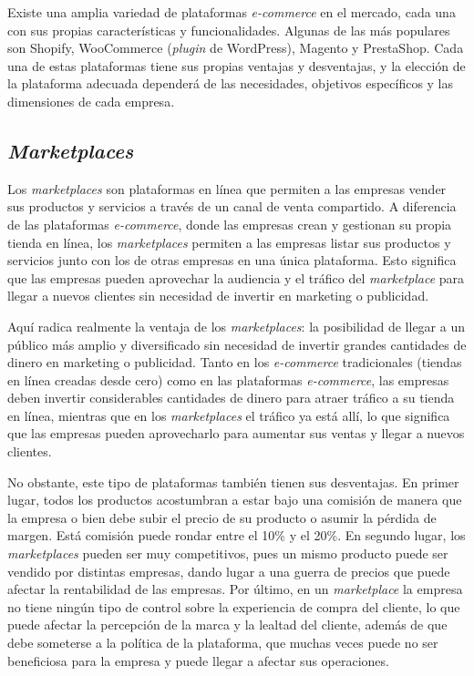 Existe una amplia variedad de plataformas \textit{e-commerce} en el mercado, cada una con sus propias características y funcionalidades. Algunas de las más populares son Shopify, WooCommerce (\textit{plugin} de WordPress), Magento y PrestaShop. Cada una de estas plataformas tiene sus propias ventajas y desventajas, y la elección de la plataforma adecuada dependerá de las necesidades, objetivos específicos y las dimensiones de cada empresa.

\subsection{\textit{Marketplaces}}

Los \textit{marketplaces} son plataformas en línea que permiten a las empresas vender sus productos y servicios a través de un canal de venta compartido. A diferencia de las plataformas \textit{e-commerce}, donde las empresas crean y gestionan su propia tienda en línea, los \textit{marketplaces} permiten a las empresas listar sus productos y servicios junto con los de otras empresas en una única plataforma. Esto significa que las empresas pueden aprovechar la audiencia y el tráfico del \textit{marketplace} para llegar a nuevos clientes sin necesidad de invertir en marketing o publicidad.

Aquí radica realmente la ventaja de los \textit{marketplaces}: la posibilidad de llegar a un público más amplio y diversificado sin necesidad de invertir grandes cantidades de dinero en marketing o publicidad. Tanto en los \textit{e-commerce} tradicionales (tiendas en línea creadas desde cero) como en las plataformas \textit{e-commerce}, las empresas deben invertir considerables cantidades de dinero para atraer tráfico a su tienda en línea, mientras que en los \textit{marketplaces} el tráfico ya está allí, lo que significa que las empresas pueden aprovecharlo para aumentar sus ventas y llegar a nuevos clientes.

No obstante, este tipo de plataformas también tienen sus desventajas. En primer lugar, todos los productos acostumbran a estar bajo una comisión de manera que la empresa o bien debe subir el precio de su producto o asumir la pérdida de margen. Está comisión puede rondar entre el 10\% y el 20\%. En segundo lugar, los \textit{marketplaces} pueden ser muy competitivos, pues un mismo producto puede ser vendido por distintas empresas, dando lugar a una guerra de precios que puede afectar la rentabilidad de las empresas. Por último, en un \textit{marketplace} la empresa no tiene ningún tipo de control sobre la experiencia de compra del cliente, lo que puede afectar la percepción de la marca y la lealtad del cliente, además de que debe someterse a la política de la plataforma, que muchas veces puede no ser beneficiosa para la empresa y puede llegar a afectar sus operaciones.

